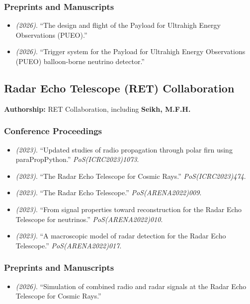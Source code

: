 \subsubsection{Preprints and Manuscripts}
\begin{itemize}
\item \textit{(2026)}. ``The design and flight of the Payload for Ultrahigh Energy Observations (PUEO).''  
\item \textit{(2026)}. ``Trigger system for the Payload for Ultrahigh Energy Observations (PUEO) balloon-borne neutrino detector.'' 
\end{itemize}
\medskip

\subsection{Radar Echo Telescope (RET) Collaboration}
\textbf{Authorship:} RET Collaboration, including \textbf{Seikh, M.F.H.}
\subsubsection{Conference Proceedings}
\begin{itemize}
\item \textit{(2023)}. ``Updated studies of radio propagation through polar firn using paraPropPython.'' \textit{PoS(ICRC2023)1073}. 
\item \textit{(2023)}. ``The Radar Echo Telescope for Cosmic Rays.'' \textit{PoS(ICRC2023)474}. 
\item \textit{(2023)}. ``The Radar Echo Telescope.'' \textit{PoS(ARENA2022)009}. 
\item \textit{(2023)}. ``From signal properties toward reconstruction for the Radar Echo Telescope for neutrinos.'' \textit{PoS(ARENA2022)010}. 
\item \textit{(2023)}. ``A macroscopic model of radar detection for the Radar Echo Telescope.'' \textit{PoS(ARENA2022)017}. 
\end{itemize}
\subsubsection{Preprints and Manuscripts}
\begin{itemize}
\item \textit{(2026)}. ``Simulation of combined radio and radar signals at the Radar Echo Telescope for Cosmic Rays.'' 
\end{itemize}
\medskip


